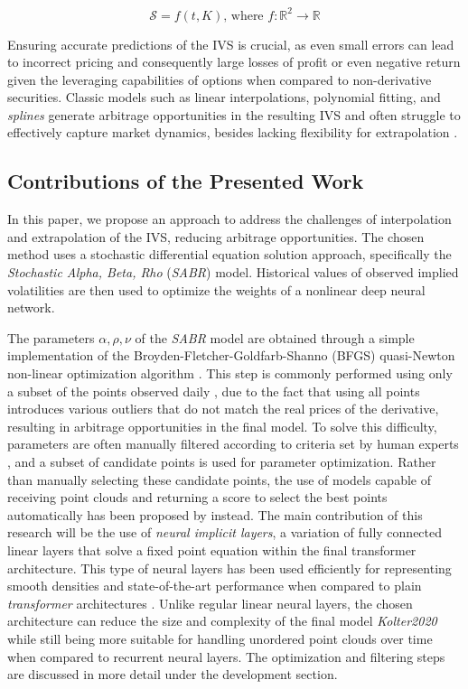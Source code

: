 \begin{equation}
		\mathcal{S} = f(t, K) \textrm{, where } f: \mathbb{R}^{2} \rightarrow  \mathbb{R}
\end{equation}


Ensuring accurate predictions of the IVS is crucial, as even small errors can lead to incorrect pricing and consequently large losses of profit or even negative return\citep{Hagan2014} given the leveraging capabilities of options when compared to non-derivative securities. Classic models such as linear interpolations, polynomial fitting, and \textit{splines} generate arbitrage opportunities in the resulting IVS and often struggle to effectively capture market dynamics, besides lacking flexibility for extrapolation \citep{Hagan2014}.

\subsection{Contributions of the Presented Work}

In this paper, we propose an approach to address the challenges of interpolation and extrapolation of the IVS, reducing arbitrage opportunities. The chosen method uses a stochastic differential equation solution approach, specifically the \textit{Stochastic Alpha, Beta, Rho} (\textit{SABR}) model. Historical values of observed implied volatilities are then used to optimize the weights of a nonlinear deep neural network. 

The parameters $\alpha, \rho, \nu$ of the \textit{SABR} model are obtained through a simple implementation of the Broyden-Fletcher-Goldfarb-Shanno (BFGS) quasi-Newton non-linear optimization algorithm \citep{Broyden1970, Fletcher1970, Goldfarb1970, Shanno1970}. This step is commonly performed using only a subset of the points observed daily \citep{Kim2021}, due to the fact that using all points introduces various outliers that do not match the real prices of the derivative, resulting in arbitrage opportunities in the final model. To solve this difficulty, parameters are often manually filtered according to criteria set by human experts \citep{Hagan2002}, and a subset of candidate points is used for parameter optimization. Rather than manually selecting these candidate points, the use of models capable of receiving point clouds and returning a score to select the best points automatically has been proposed by \citep{Hagan2002} instead. The main contribution of this research will be the use of \textit{neural implicit layers}, a variation of fully connected linear layers that solve a fixed point equation within the final transformer architecture. This type of neural layers has been used efficiently for representing smooth densities and state-of-the-art performance when compared to plain \textit{transformer} architectures \citep{Kolter2020, Kawaguchi2021}. Unlike regular linear neural layers, the chosen architecture can reduce the size and complexity of the final model \textit{Kolter2020} while still being more suitable for handling unordered point clouds over time \citep{Kim2024} when compared to recurrent neural layers. The optimization and filtering steps are discussed in more detail under the development section.

